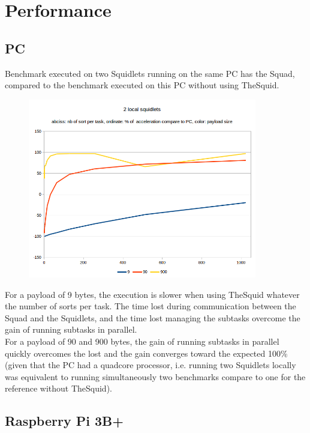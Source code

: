 \section{Performance}

\subsection{PC}

Benchmark executed on two Squidlets running on the same PC has the Squad, compared to the benchmark executed on this PC without using TheSquid.

\begin{center}
\begin{figure}[H]
\centering\includegraphics[width=10cm]{./benchmark01.png}\\
\end{figure}
\end{center}

For a payload of 9 bytes, the execution is slower when using TheSquid whatever the number of sorts per task. The time lost during communication between the Squad and the Squidlets, and the time lost managing the subtasks overcome the gain of running subtasks in parallel.\\

For a payload of 90 and 900 bytes, the gain of running subtasks in parallel quickly overcomes the lost and the gain converges toward the expected 100\% (given that the PC had a quadcore processor, i.e. running two Squidlets locally was equivalent to running simultaneously two benchmarks compare to one for the reference without TheSquid).\\

\subsection{Raspberry Pi 3B+}


